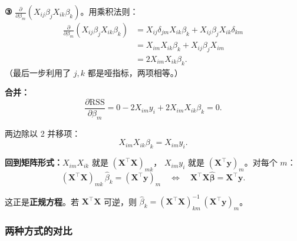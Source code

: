 \textbf{③} $\frac{\partial}{\partial \beta_m}(X_{ij}\beta_j X_{ik}\beta_k)$。用乘积法则：
\begin{align}
    \frac{\partial}{\partial \beta_m}(X_{ij}\beta_j X_{ik}\beta_k)
    &= X_{ij}\delta_{jm} X_{ik}\beta_k + X_{ij}\beta_j X_{ik}\delta_{km} \nonumber\\
    &= X_{im} X_{ik}\beta_k + X_{ij}\beta_j X_{im} \nonumber\\
    &= 2 X_{im} X_{ik}\beta_k. \label{eq:einstein_quad_deriv}
\end{align}
（最后一步利用了 $j,k$ 都是哑指标，两项相等。）

\medskip
\textbf{合并：}
\begin{equation}\label{eq:einstein_gradient}
    \frac{\partial \mathrm{RSS}}{\partial \beta_m}
    = 0 - 2 X_{im} y_i + 2 X_{im} X_{ik} \beta_k = 0.
\end{equation}

两边除以 2 并移项：
\begin{equation}\label{eq:einstein_normal}
    X_{im} X_{ik} \beta_k = X_{im} y_i.
\end{equation}

\medskip
\textbf{回到矩阵形式：}$X_{im} X_{ik}$ 就是 $(\mathbf{X}^\top \mathbf{X})_{mk}$，
$X_{im} y_i$ 就是 $(\mathbf{X}^\top \mathbf{y})_m$。对每个 $m$：
\[
    (\mathbf{X}^\top \mathbf{X})_{mk}\,\hat{\beta}_k = (\mathbf{X}^\top \mathbf{y})_m
    \quad\Longleftrightarrow\quad
    \mathbf{X}^\top \mathbf{X} \hat{\bm{\beta}} = \mathbf{X}^\top \mathbf{y}.
\]

这正是\textbf{正规方程}。若 $\mathbf{X}^\top \mathbf{X}$ 可逆，则
$\hat{\beta}_k = (\mathbf{X}^\top \mathbf{X})^{-1}_{km}\, (\mathbf{X}^\top \mathbf{y})_m$。

\subsubsection{两种方式的对比}

